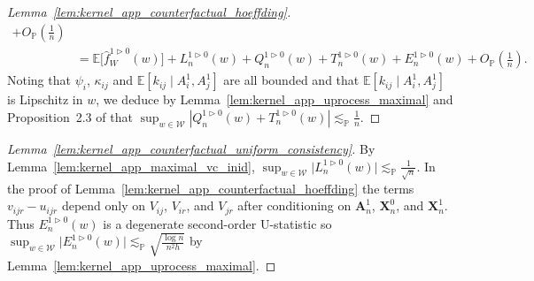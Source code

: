 \documentclass[11pt,lof]{puthesis}
\renewcommand{\P}{\ensuremath{\mathbb{P}}}
\newcommand{\E}{\ensuremath{\mathbb{E}}}
\newcommand{\bX}{\ensuremath{\mathbf{X}}}
\newcommand{\bA}{\ensuremath{\mathbf{A}}}
\newcommand{\cW}{\ensuremath{\mathcal{W}}}
\theoremstyle{break}
\theoremstyle{proof}
\newtheorem{proof}{Proof}
\begin{document}
\begin{proof}[Lemma~\ref{lem:kernel_app_counterfactual_hoeffding}]
\begin{align*}
    + O_\P\left( \frac{1}{n} \right) \\
    &=
    \E\big[\hat f_W^{1 \triangleright 0}(w) \big]
    + L_n^{1 \triangleright 0}(w)
    + Q_n^{1 \triangleright 0}(w)
    + T_n^{1 \triangleright 0}(w)
    + E_n^{1 \triangleright 0}(w)
    + O_\P\left( \frac{1}{n} \right).
  \end{align*}
  Noting that $\psi_i$, $\kappa_{i j}$
  and $\E[k_{i j} \mid A_i^1, A_j^1]$
  are all bounded and that
  $\E[k_{i j} \mid A_i^1, A_j^1]$
  is Lipschitz in $w$,
  we deduce by
  Lemma~\ref{lem:kernel_app_uprocess_maximal}
  and Proposition~2.3 of
  \citet{arcones1993limit} that
  $\sup_{w \in \cW} |Q_n^{1 \triangleright 0}(w)
  + T_n^{1 \triangleright 0}(w)| \lesssim_\P \frac 1n$.
\end{proof}

\begin{proof}[Lemma~\ref{lem:kernel_app_counterfactual_uniform_consistency}]

  By Lemma~\ref{lem:kernel_app_maximal_vc_inid},
  $\sup_{w \in \cW} \big|L_n^{1 \triangleright 0}(w)\big|
  \lesssim_\P \frac{1}{\sqrt n}$.
  In the proof of Lemma~\ref{lem:kernel_app_counterfactual_hoeffding}
  the terms $v_{i j r} - u_{i j r}$ depend only on
  $V_{i j}$, $V_{i r}$, and $V_{jr}$
  after conditioning on $\bA_n^1$, $\bX_n^0$, and $\bX_n^1$.
  Thus $E_n^{1 \triangleright 0}(w)$ is a degenerate second-order
  U-statistic so
  $\sup_{w \in \cW} \big|E_n^{1 \triangleright 0}(w)\big|
  \lesssim_\P \sqrt{\frac{\log n}{n^2h}}$
  by Lemma~\ref{lem:kernel_app_uprocess_maximal}.
\end{proof}
\end{document}
